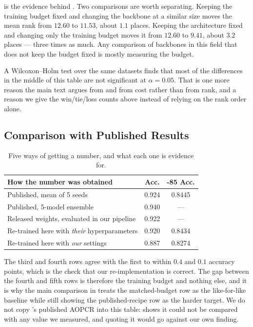  is the evidence behind . Two comparisons are worth separating.
Keeping the training budget fixed and changing the backbone at a similar size moves the mean rank
from $12.60$ to $11.53$, about $1.1$ places. Keeping the architecture fixed and changing only the
training budget moves it from $12.60$ to $9.41$, about $3.2$ places --- three times as much. Any
comparison of backbones in this field that does not keep the budget fixed is mostly measuring the
budget.

A Wilcoxon--Holm test over the same datasets finds that most of the differences in the middle of this
table are not significant at $\alpha = 0.05$. That is one more reason the main text argues from
\webtraffic{} and from cost rather than from \ucr{} rank, and a reason we give the win/tie/loss counts
above instead of relying on the rank order alone.

\subsection{Comparison with Published \millet{} Results}
\label{app:published}

\begin{table}[h]
\caption{Five ways of getting a \millet{} number, and what each one is evidence for.}
\label{tab:app_published}
\begin{center}
\small
\begin{tabular}{lcc}
\toprule
\textbf{How the number was obtained} & \webtraffic{} Acc. & \ucr{}-85 Acc. \\
\midrule
Published, mean of 5 seeds \citep{early2024millet} & 0.924 & 0.8445 \\
Published, 5-model ensemble                        & 0.940 & --- \\
Released weights, evaluated in our pipeline        & 0.922 & --- \\
Re-trained here with \emph{their} hyperparameters  & 0.920 & 0.8434 \\
Re-trained here with \emph{our} settings           & 0.887 & 0.8274 \\
\bottomrule
\end{tabular}
\end{center}
\end{table}

The third and fourth rows agree with the first to within $0.4$ and $0.1$ accuracy points, which is
the check that our re-implementation is correct. The gap between the fourth and fifth rows is
therefore the training budget and nothing else, and it is why the main comparison in 
treats the matched-budget row as the like-for-like baseline while still showing the published-recipe
row as the harder target. We do not copy \millet{}'s published AOPCR into this table:
 shows it could not be compared with any value we measured, and quoting it would
go against our own finding.

